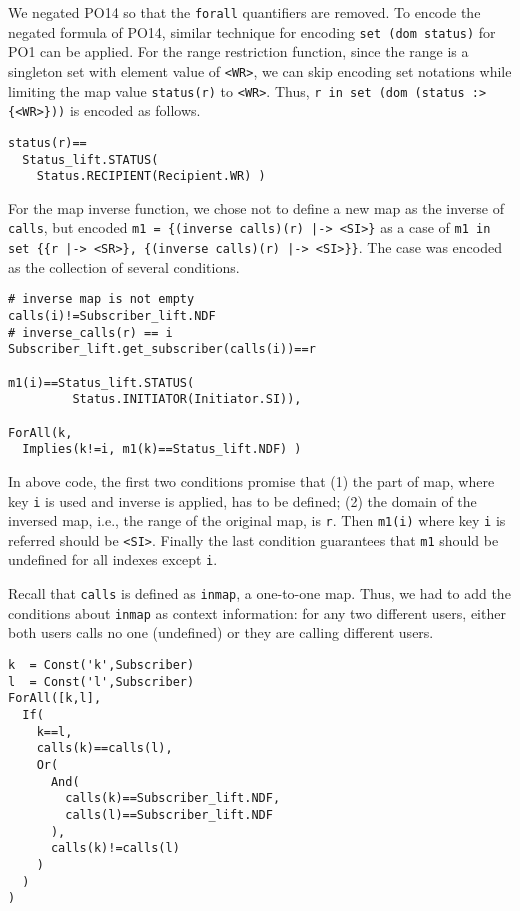 We negated PO14 so that the {\tt forall} quantifiers are removed. To encode the negated formula of PO14, similar technique for  encoding {\tt set (dom status)} for PO1 can be applied. For the range restriction function, since the range is a singleton set with element value of {\tt <WR>}, we can skip encoding set notations while limiting the map value {\tt status(r)} to {\tt <WR>}. Thus, {\tt r in set (dom (status :> \{<WR>\}))} is encoded as follows.

\begin{mdframed}[roundcorner=5pt,shadow=true]
\begin{Verbatim}[fontsize=\small]
status(r)==
  Status_lift.STATUS(
    Status.RECIPIENT(Recipient.WR) )
\end{Verbatim}
\end{mdframed}

For the map inverse function, we chose not to define a new map as the inverse of {\tt calls}, but encoded {\tt m1 = \{(inverse calls)(r) |-> <SI>\}} as a case of {\tt m1 in set \{\{r |-> <SR>\}, \{(inverse calls)(r) |-> <SI>\}\}}. The case was encoded as the collection of several conditions. 

\begin{mdframed}[roundcorner=5pt,shadow=true]
\begin{Verbatim}[fontsize=\small]
# inverse map is not empty
calls(i)!=Subscriber_lift.NDF 
# inverse_calls(r) == i
Subscriber_lift.get_subscriber(calls(i))==r

m1(i)==Status_lift.STATUS(
         Status.INITIATOR(Initiator.SI)),

ForAll(k, 
  Implies(k!=i, m1(k)==Status_lift.NDF) )
\end{Verbatim}
\end{mdframed}

In above code, the first two conditions promise that (1) the part of map, where key {\tt i} is used and inverse is applied, has to be defined; (2) the domain of the inversed map, i.e., the range of the original map, is {\tt r}. Then {\tt m1(i)} where key {\tt i} is referred should be {\tt <SI>}. Finally the last condition guarantees that {\tt m1} should be undefined for all indexes except {\tt i}.

Recall that {\tt calls} is defined as {\tt inmap}, a one-to-one map. Thus, we had to add  the conditions about {\tt inmap} as context information: for any two different users, either both users calls no one (undefined) or they are calling different users.

\begin{mdframed}[roundcorner=5pt,shadow=true]
\begin{Verbatim}[fontsize=\small]
k  = Const('k',Subscriber)
l  = Const('l',Subscriber)
ForAll([k,l],
  If(
    k==l,
    calls(k)==calls(l),
    Or(
      And(
        calls(k)==Subscriber_lift.NDF,
        calls(l)==Subscriber_lift.NDF
      ),
      calls(k)!=calls(l)
    )
  )
)
\end{Verbatim}
\end{mdframed}

